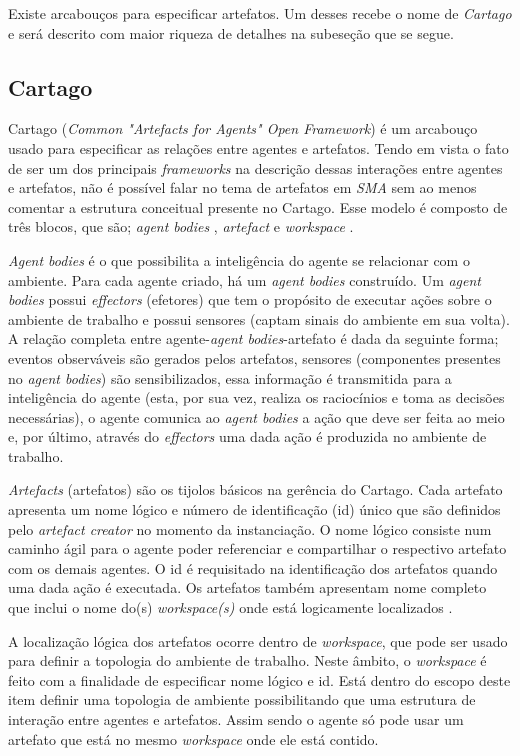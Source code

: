 Existe arcabouços para especificar artefatos. Um desses recebe o nome de \textit{Cartago} e será descrito com maior riqueza de detalhes na subeseção que se segue.
 
 \subsection{Cartago}

Cartago (\textit{Common "Artefacts for Agents" Open Framework}) é um arcabouço usado para especificar as relações entre agentes e artefatos. Tendo em vista o fato de ser um dos principais \textit{frameworks} na descrição dessas interações entre agentes e artefatos, não é possível falar no tema de artefatos em \textit{SMA} sem ao menos comentar a estrutura conceitual presente no Cartago. Esse modelo é composto de três blocos, que são; \textit{agent bodies} , \textit{artefact} e \textit{workspace} \cite{cartago}.

 \textit{Agent bodies} é  o que possibilita a inteligência do agente se relacionar com o ambiente. Para cada agente criado, há um \textit{agent bodies} construído. Um \textit{agent bodies} possui \textit{effectors} (efetores) que tem o propósito de executar ações sobre o ambiente de trabalho e possui sensores (captam sinais do ambiente em sua volta). A relação completa entre agente-\textit{agent bodies}-artefato é dada da seguinte forma; eventos observáveis são gerados pelos artefatos, sensores (componentes presentes no \textit{agent bodies}) são sensibilizados, essa informação é transmitida para a inteligência do  agente (esta, por sua vez, realiza os raciocínios e toma as  decisões necessárias), o agente comunica ao \textit{agent bodies} a ação que deve ser feita ao 
 meio e, por último, através do \textit{effectors} uma dada ação é produzida no ambiente de trabalho. 

 \textit{Artefacts} (artefatos) são os tijolos básicos na gerência do Cartago. Cada artefato apresenta um nome lógico e número de identificação (id) único que são definidos pelo \textit{artefact creator} no momento da instanciação. O nome lógico consiste num caminho ágil para o agente poder referenciar  e compartilhar o respectivo artefato com os demais agentes. O id é requisitado na identificação dos artefatos quando uma dada ação é executada. Os artefatos também apresentam nome completo que inclui o nome do(s) \textit{workspace(s)} onde está logicamente localizados \cite{cartago}.

 A localização lógica dos artefatos ocorre dentro de \textit{workspace}, que pode ser usado para definir a topologia do ambiente de trabalho. Neste âmbito, o \textit{workspace} é feito com a finalidade de especificar nome lógico e id. Está dentro do escopo deste item definir uma topologia de ambiente possibilitando que uma estrutura de interação entre agentes e artefatos. Assim sendo o agente só pode usar um artefato que está no mesmo \textit{workspace} onde ele está contido. 